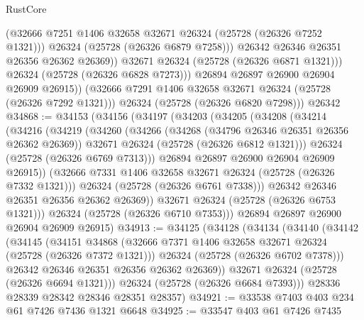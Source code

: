 \begin{lexlean}{RustCore}
\begin{coremodule}
                    (@32666 @7251 @1406 @32658 @32671 @26324 (@25728 (@26326 @7252 @1321)))
                    @26324
                    (@25728 (@26326 @6879 @7258)))
                  @26342
                  @26346
                  @26351
                  @26356
                  @26362
                  @26369))
              @32671
              @26324
              (@25728 (@26326 @6871 @1321)))
            @26324
            (@25728 (@26326 @6828 @7273)))
          @26894
          @26897
          @26900
          @26904
          @26909
          @26915))
      (@32666 @7291 @1406 @32658 @32671 @26324 (@25728 (@26326 @7292 @1321)))
      @26324
      (@25728 (@26326 @6820 @7298)))
    @26342
@34868 := @34153
    (@34156
      (@34197
        (@34203
          (@34205
            (@34208
              (@34214
                (@34216
                  (@34219
                    (@34260
                      (@34266
                        (@34268 (@34796 @26346 @26351 @26356 @26362 @26369))
                        @32671
                        @26324
                        (@25728 (@26326 @6812 @1321)))
                      @26324
                      (@25728 (@26326 @6769 @7313)))
                    @26894
                    @26897
                    @26900
                    @26904
                    @26909
                    @26915))
                (@32666 @7331 @1406 @32658 @32671 @26324 (@25728 (@26326 @7332 @1321)))
                @26324
                (@25728 (@26326 @6761 @7338)))
              @26342
              @26346
              @26351
              @26356
              @26362
              @26369))
          @32671
          @26324
          (@25728 (@26326 @6753 @1321)))
        @26324
        (@25728 (@26326 @6710 @7353)))
      @26894
      @26897
      @26900
      @26904
      @26909
      @26915)
@34913 := @34125
    (@34128
      (@34134
        (@34140
          (@34142
            (@34145
              (@34151
                @34868
                (@32666 @7371 @1406 @32658 @32671 @26324 (@25728 (@26326 @7372 @1321)))
                @26324
                (@25728 (@26326 @6702 @7378)))
              @26342
              @26346
              @26351
              @26356
              @26362
              @26369))
          @32671
          @26324
          (@25728 (@26326 @6694 @1321)))
        @26324
        (@25728 (@26326 @6684 @7393)))
      @28336
      @28339
      @28342
      @28346
      @28351
      @28357)
@34921 := @33538 @7403 @403 @234 @61 @7426 @7436 @1321 @6648
@34925 := @33547 @403 @61 @7426 @7435

\end{coremodule}
\end{lexlean}
